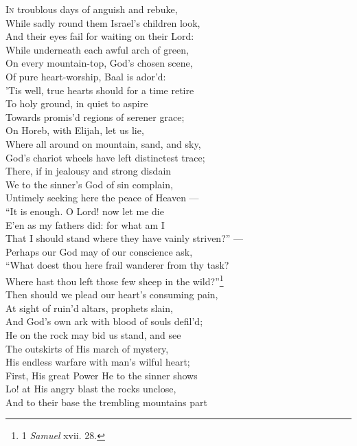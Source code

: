 \textsc{In} troublous days of anguish and rebuke, \\
 While sadly round them Israel’s children look, \\
 And their eyes fail for waiting on their Lord: \\
 While underneath each awful arch of green, \\
 On every mountain-top, God’s chosen scene, \\
 Of pure heart-worship, Baal is ador’d: \\
  ’Tis well, true hearts should for a time retire \\
 To holy ground, in quiet to aspire \\
 Towards promis’d regions of serener grace; \\
 On Horeb, with Elijah, let us lie, \\
 Where all around on mountain, sand, and sky, \\
 God’s chariot wheels have left distinctest trace; \\
  There, if in jealousy and strong disdain \\
 We to the sinner’s God of sin complain, \\
 Untimely seeking here the peace of Heaven — \\
 “It is enough. O Lord! now let me die \\
 E’en as my fathers did: for what am I \\
 That I should stand where they have vainly striven?” — \\
  Perhaps our God may of our conscience ask, \\
 “What doest thou here frail wanderer from thy task? \\
 Where hast thou left those few sheep in the wild?”\footnote{1 \emph{Samuel} xvii. 28.} \\
 Then should we plead our heart’s consuming pain, \\
 At sight of ruin’d altars, prophets slain, \\
 And God’s own ark with blood of souls defil’d; \\
  He on the rock may bid us stand, and see \\
 The outskirts of His march of mystery, \\
 His endless warfare with man’s wilful heart; \\
 First, His great Power He to the sinner shows \\
 Lo! at His angry blast the rocks unclose, \\
 And to their base the trembling mountains part \\
